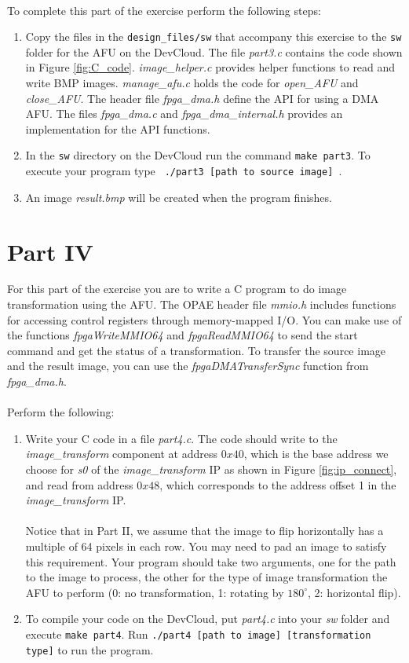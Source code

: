 \documentclass[epsfig,10pt,fullpage]{article}
\newcommand{\CommonDocsPath}{../../common/docs}
\begin{document}
\\
To complete this part of the exercise perform the following steps:
\begin{enumerate}
    \item Copy the files in the \texttt{design\_files/sw} that accompany this exercise to the \texttt{sw} folder for the AFU on the DevCloud. The file \emph{part3.c} contains the code shown in Figure \ref{fig:C_code}. \emph{image\_helper.c} provides helper functions to read and write BMP images. \emph{manage\_afu.c} holds the code for \emph{open\_AFU} and \emph{close\_AFU}. The header file \emph{fpga\_dma.h} define the API for using a DMA AFU. The files \emph{fpga\_dma.c} and \emph{fpga\_dma\_internal.h} provides an implementation for the API functions.
    \item In the \texttt{sw} directory on the DevCloud run the command \verb|make part3|. To execute your program type \verb| ./part3 [path to source image] |.
    \item An image \emph{result.bmp} will be created when the program finishes. 
\end{enumerate}


\section*{Part IV}
For this part of the exercise you are to write a C program to do image transformation using the AFU. The OPAE header file {\it mmio.h} includes functions for accessing control registers through memory-mapped I/O. You can make use of the functions {\it fpgaWriteMMIO64} and {\it fpgaReadMMIO64} to send the start command and get the status of a transformation.  To transfer the source image and the result image, you can use the {\it fpgaDMATransferSync} function from {\it fpga\_dma.h}. \\
\\
Perform the following:
\begin{enumerate}
    \item Write your C code in a file {\it part4.c}. The code should write to the {\it image\_transform} component at address $0x40$, which is the base address we choose for {\it s0} of the {\it image\_transform} IP as shown in Figure \ref{fig:ip_connect}, and read from address $0x48$, which corresponds to the address offset 1 in the {\it image\_transform} IP.\\
    \\
    Notice that in Part II, we assume that the image to flip horizontally has a multiple of 64 pixels in each row. You may need to pad an image to satisfy this requirement. Your program should take two arguments, one for the path to the image to process, the other for the type of image transformation the AFU to perform (0: no transformation, 1: rotating by $180^\circ$, 2: horizontal flip). 
    
    \item To compile your code on the DevCloud, put {\it part4.c} into your {\it sw} folder and execute \verb|make part4|. Run \verb|./part4 [path to image] [transformation type]| to run the program.
\end{enumerate}


\end{document}
